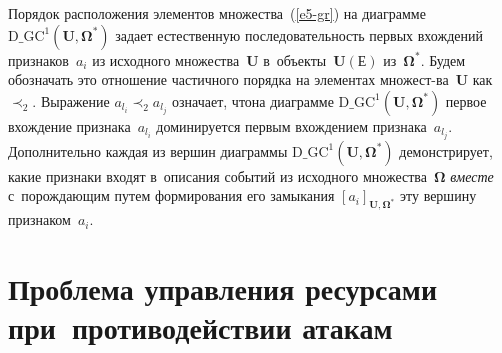 \begin{multicols}{2}
  Порядок расположения элементов множества~(\ref{e5-gr}) на диаграмме 
$\mathrm{D}\_\mathrm{GC}^1(\mathbf{U},{\boldsymbol{\Omega}}^*)$ задает естест\-вен\-ную 
последовательность первых вхождений признаков~$a_i$ из исходного 
множества~$\mathbf{U}$ в~объекты~$\mathbf{U}(\mathbf{Е})$ 
из~$\boldsymbol{\Omega}^*$. Будем обозначать это отношение частичного 
порядка на элементах множест-\linebreak ва~$\mathbf{U}$ как~$\prec_2$. Выражение 
$a_{l_i}\prec_2 a_{l_j}$ означает, что\linebreak на диаграмме 
$\mathrm{D}\_\mathrm{GC}^1(\mathbf{U},{\boldsymbol{\Omega}}^*)$ первое вхождение\linebreak 
признака~$a_{l_i}$ доминируется первым вхождением признака~$a_{l_j}$. 
Дополнительно каждая из вершин диаграммы 
$\mathrm{D}\_\mathrm{GC}^1(\mathbf{U},{\boldsymbol{\Omega}}^*)$ демонстрирует, какие 
признаки входят в~описания событий из исходного 
множества~$\boldsymbol{\Omega}$ \textit{вместе} с~порождающим путем 
формирования его замыкания $[a_i]_{\mathbf{U},{\boldsymbol{\Omega}}^*}$ эту вершину 
признаком~$a_i$.
  
\section{Проблема управления ресурсами при~противодействии 
атакам}


\end{multicols}
